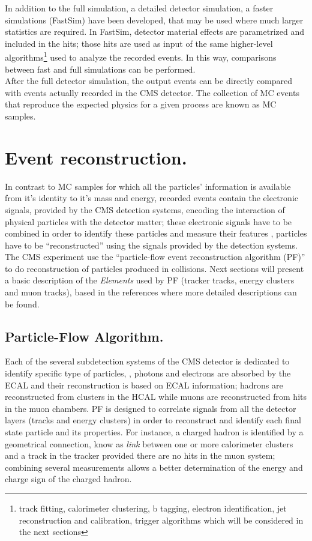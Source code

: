 \noindent In addition to the full simulation, \ie a detailed detector simulation, a faster simulations (FastSim) have been developed, that may be used where much larger statistics are required. In FastSim, detector material effects are parametrized and included in the hits; those hits are used as input of the same higher-level algorithms\footnote{track fitting, calorimeter clustering, b tagging, electron identification, jet reconstruction and calibration, trigger algorithms which will be considered in the next sections} used to analyze the recorded events. In this way, comparisons between fast and full simulations can be performed\cite{fastsim}.\\

\noindent After the full detector simulation, the output events can be directly compared with events actually recorded in the CMS detector. The collection of MC events that reproduce the expected physics for a given process are known as MC samples.

\section{Event reconstruction.}

\noindent In contrast to MC samples for which all the particles' information is available from it's identity to it's mass and energy, recorded events contain the electronic signals, provided by the CMS detection systems, encoding the interaction of physical particles with the detector matter; these electronic signals have to be combined in order to identify these particles and measure their features \ie, particles have to be ``reconstructed'' using the signals provided by the detection systems. The CMS experiment use the ``particle-flow event reconstruction algorithm (PF)'' to do reconstruction of particles produced in \pp collisions. Next sections will present a basic description of the \textit{Elements} used by PF (tracker tracks, energy clusters and muon tracks), based in the references \cite{particle_flow, particle_flow2} where more detailed descriptions can be found.  

\subsection{Particle-Flow Algorithm.}

\noindent Each of the several subdetection systems of the CMS detector is dedicated to identify specific type of particles, \ie, photons and electrons are absorbed by the ECAL and their reconstruction is based on ECAL information; hadrons are reconstructed from clusters in the HCAL while muons are reconstructed from hits in the muon chambers. PF is designed to correlate signals from all the detector layers (tracks and energy clusters) in order to reconstruct and identify each final state particle and its properties. For instance, a charged hadron is identified by a geometrical connection, know as \textit{link} between one or more calorimeter clusters and a track in the tracker provided there are no hits in the muon system; combining several measurements allows a better determination of the energy and charge sign of the charged hadron.   

